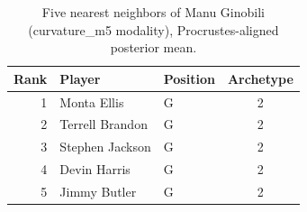 \begin{table}[htbp]
  \centering\small
  \begin{tabular}{rllc}
    \toprule
    Rank & Player & Position & Archetype \\
    \midrule
    1 & Monta Ellis & G & 2 \\
    2 & Terrell Brandon & G & 2 \\
    3 & Stephen Jackson & G & 2 \\
    4 & Devin Harris & G & 2 \\
    5 & Jimmy Butler & G & 2 \\
    \bottomrule
  \end{tabular}
  \caption{Five nearest neighbors of Manu Ginobili (curvature_m5 modality), Procrustes-aligned posterior mean.}
  \label{tab:Manu_Ginobili_neighbors_curvature_m5}
\end{table}


